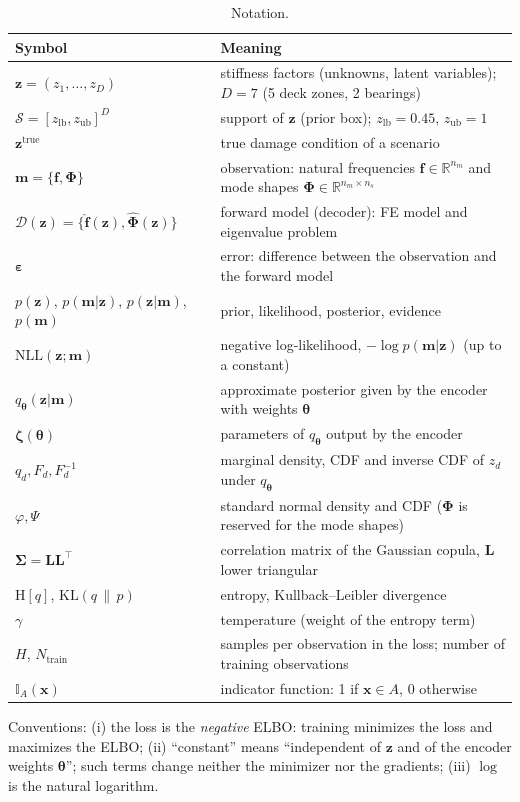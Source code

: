 \documentclass[11pt,a4paper]{article}
\numberwithin{equation}{section}
\theoremstyle{plain}
\theoremstyle{definition}
\theoremstyle{remark}
\newcommand{\m}{\mathbf{m}}
\newcommand{\z}{\mathbf{z}}
\newcommand{\x}{\mathbf{x}}
\newcommand{\eps}{\bm{\varepsilon}}
\newcommand{\thetab}{\bm{\theta}}
\newcommand{\zetab}{\bm{\zeta}}
\newcommand{\Sig}{\bm{\Sigma}}
\newcommand{\Lb}{\mathbf{L}}
\newcommand{\Sset}{\mathcal{S}}
\newcommand{\R}{\mathbb{R}}
\newcommand{\KL}{\mathrm{KL}}
\newcommand{\Hent}{\mathrm{H}}
\newcommand{\NLL}{\mathrm{NLL}}
\newcommand{\Dc}{\mathcal{D}}
\newcommand{\zlb}{z_{\text{lb}}}
\newcommand{\zub}{z_{\text{ub}}}
\newcommand{\Ntr}{N_{\text{train}}}
\newcommand{\qth}{q_{\bm{\theta}}}
\newcommand{\ind}{\mathbb{I}}
\begin{document}
\begin{table}[h]
\centering
\caption{Notation.}
\label{tab:notation}
\small
\begin{tabular}{@{}lp{9.2cm}@{}}
\toprule
Symbol & Meaning \\
\midrule
$\z=(z_1,\dots,z_D)$ & stiffness factors (unknowns, latent variables); $D=7$ (5 deck zones, 2 bearings) \\
$\Sset=[\zlb,\zub]^D$ & support of $\z$ (prior box); $\zlb=0.45$, $\zub=1$ \\
$\z^{\text{true}}$ & true damage condition of a scenario \\
$\m=\{\mathbf{f},\bm{\Phi}\}$ & observation: natural frequencies $\mathbf{f}\in\R^{n_m}$ and mode shapes $\bm\Phi\in\R^{n_m\times n_s}$ \\
$\Dc(\z)=\{\hat{\mathbf f}(\z),\hat{\bm\Phi}(\z)\}$ & forward model (decoder): FE model and eigenvalue problem \\
$\eps$ & error: difference between the observation and the forward model \\
$p(\z)$, $p(\m|\z)$, $p(\z|\m)$, $p(\m)$ & prior, likelihood, posterior, evidence \\
$\NLL(\z;\m)$ & negative log-likelihood, $-\log p(\m|\z)$ (up to a constant) \\
$\qth(\z|\m)$ & approximate posterior given by the encoder with weights $\thetab$ \\
$\zetab(\thetab)$ & parameters of $\qth$ output by the encoder \\
$q_d,F_d,F_d^{-1}$ & marginal density, CDF and inverse CDF of $z_d$ under $\qth$ \\
$\varphi,\Psi$ & standard normal density and CDF ($\bm\Phi$ is reserved for the mode shapes) \\
$\Sig=\Lb\Lb^\top$ & correlation matrix of the Gaussian copula, $\Lb$ lower triangular \\
$\Hent[q]$, $\KL(q\,\|\,p)$ & entropy, Kullback--Leibler divergence \\
$\gamma$ & temperature (weight of the entropy term) \\
$H$, $\Ntr$ & samples per observation in the loss; number of training observations \\
$\ind_A(\x)$ & indicator function: 1 if $\x\in A$, 0 otherwise \\
\bottomrule
\end{tabular}
\end{table}

Conventions: (i) the loss is the \emph{negative} ELBO: training minimizes the loss and maximizes the ELBO; (ii) ``constant'' means ``independent of $\z$ and of the encoder weights $\thetab$''; such terms change neither the minimizer nor the gradients; (iii) $\log$ is the natural logarithm.
\end{document}
